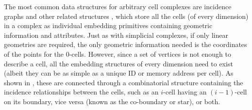 The most common data structures for arbitrary cell complexes are incidence graphs and other related structures \citep{Rossignac89,Masuda93,Sohanpanah89}, which store all the cells (of every dimension) in a complex as individual embedding primitives containing  geometric information and attributes.
Just as with simplicial complexes, if only linear geometries are required, the only geometric information needed is the coordinates of the points for the 0-cells.
However, since a set of vertices is not enough to describe a cell, all the embedding structures of every dimension need to exist (albeit they can be as simple as a unique ID or memory address per cell).
As shown in , these are connected through a combinatorial structure containing the incidence relationships between the cells, such as an $i$-cell having an $(i-1)$-cell on its boundary, vice versa (known as the co-boundary or star), or both.
